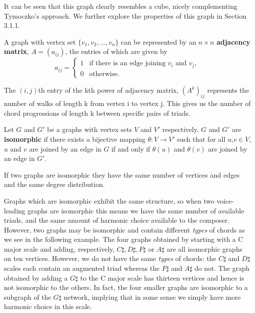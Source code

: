 \documentclass[]{tMAM2e}
\begin{document}
It can be seen that this graph clearly resembles a cube, nicely complementing Tymoczko's approach. We further explore the properties of this graph in Section 3.1.1.

\begin{definition} A graph with vertex set $\{ v_1,v_2,...,v_n \}$ can be represented by an $n \times n$ \textbf{adjacency matrix}, $A=(a_{ij})$, the entries of which are given by 
\begin{equation}
 a_{ij}=\begin{cases}
    1 & \text{if there is an edge joining $v_i$ and $v_j$},\\
    0 & \text{otherwise}.
  \end{cases}
\end{equation}
\end{definition}

\begin{remark}The $(i,j)$th entry of the kth power of adjacency matrix, $(A^k)_{ij}$ represents the number of walks of length k from vertex i to vertex j.
This gives us the number of chord progressions of length k between specific pairs of triads. \end{remark}

\begin{definition} Let $G$ and $G'$ be a graphs with vertex sets $V$ and $V'$ respectively. $G$ and $G'$ are \textbf{isomorphic} if there exists a bijective mapping $\theta:V\rightarrow V'$ such that for all $u$,$v\in V$, $u$ and $v$ are joined by an edge in $G$ if and only if $\theta(u)$ and $\theta(v)$ are joined by an edge in $G'$. \end{definition}

\begin{remark}If two graphs are isomorphic they have the same number of vertices and edges and the same degree distribution.
\end{remark}

Graphs which are isomorphic exhibit the same structure, so when two voice-leading graphs are isomorphic this means we have the same number of available triads, and the same amount of harmonic choice available to the composer. However, two graphs may be isomorphic and contain different \textit{types} of chords as we see in the following example. The four graphs obtained by starting with a C major scale and adding, respectively, $C\sharp, D\sharp, F\sharp$ or $A\sharp$ are all isomorphic graphs on ten vertices. However, we do not have the same \textit{types} of chords: the $C \sharp$ and $D\sharp$ scales each contain an augmented triad whereas the $F\sharp$ and $A \sharp$ do not. The graph obtained by adding a $G\sharp$ to the C major scale has thirteen vertices and hence is not isomorphic to the others. In fact, the four smaller graphs are isomorphic to a subgraph of the $G\sharp$ network, implying that in some sense we simply have more harmonic choice in this scale. 
\end{document}

